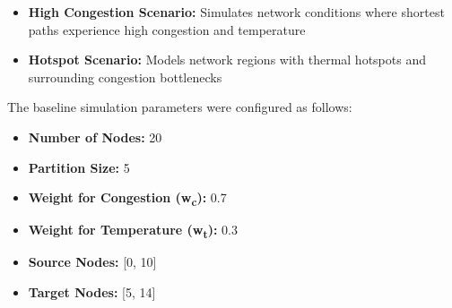 \documentclass[conference]{IEEEtran}
\begin{document}
\begin{itemize}
    \item \textbf{High Congestion Scenario:} Simulates network conditions where shortest paths experience high congestion and temperature
    \item \textbf{Hotspot Scenario:} Models network regions with thermal hotspots and surrounding congestion bottlenecks
\end{itemize}

The baseline simulation parameters were configured as follows:
\begin{itemize}
    \item \textbf{Number of Nodes:} 20
    \item \textbf{Partition Size:} 5
    \item \textbf{Weight for Congestion (w\textsubscript{c}):} 0.7
    \item \textbf{Weight for Temperature (w\textsubscript{t}):} 0.3
    \item \textbf{Source Nodes:} [0, 10]
    \item \textbf{Target Nodes:} [5, 14]
\end{itemize}
\end{document}

